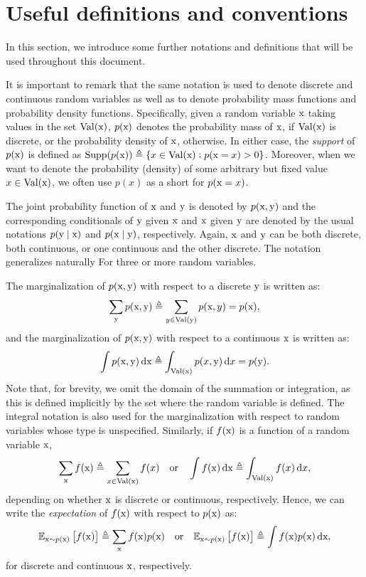 \section{Useful definitions and conventions}
\label{sec:definitions}
In this section, we introduce some further notations and definitions that will be used throughout this document.

It is important to remark that the same notation is used to denote discrete and continuous random variables as well as to denote probability mass functions and probability density functions. Specifically, given a random variable ${\textnormal{x}}$ taking values in the set $\mathrm{Val}({\textnormal{x}})$, $p({\textnormal{x}})$ denotes the probability mass of ${\textnormal{x}}$, if $\mathrm{Val}({\textnormal{x}})$ is discrete, or the probability density of ${\textnormal{x}}$, otherwise. In either case, the \emph{support} of $p({\textnormal{x}})$ is defined as $\mathrm{Supp}(p({\textnormal{x}})) \triangleq \lbrace x \in \mathrm{Val}({\textnormal{x}}): p({\textnormal{x}}=x) > 0 \rbrace$. Moreover, when we want to denote the probability (density) of some arbitrary but fixed value $x \in \mathrm{Val}({\textnormal{x}})$, we often use $p(x)$ as a short for $p({\textnormal{x}}=x)$.

The joint probability function of ${\textnormal{x}}$ and ${\textnormal{y}}$ is denoted by $p({\textnormal{x}},{\textnormal{y}})$ and the corresponding conditionals of ${\textnormal{y}}$ given ${\textnormal{x}}$ and ${\textnormal{x}}$ given ${\textnormal{y}}$ are denoted by the usual notations $p({\textnormal{y}} \mid {\textnormal{x}})$ and $p({\textnormal{x}} \mid {\textnormal{y}})$, respectively. Again, ${\textnormal{x}}$ and ${\textnormal{y}}$ can be both discrete, both continuous, or one continuous and the other discrete. The notation generalizes naturally For three or more random variables.

The marginalization of $p({\textnormal{x}},{\textnormal{y}})$ with respect to a discrete ${\textnormal{y}}$ is written as:
\begin{equation}
    \sum_{{\textnormal{y}}} p({\textnormal{x}},{\textnormal{y}}) \triangleq \sum_{y \in \mathrm{Val}({\textnormal{y}})} p({\textnormal{x}},y) = p({\textnormal{x}}),
\end{equation}
and the marginalization of $p({\textnormal{x}},{\textnormal{y}})$ with respect to a continuous ${\textnormal{x}}$ is written as:
\begin{equation}
    \int p({\textnormal{x}},{\textnormal{y}}) {\,\text{d}} {\textnormal{x}} \triangleq \int_{\mathrm{Val}({\textnormal{x}})} p(x,{\textnormal{y}}) {\,\text{d}} x = p({\textnormal{y}}).
\end{equation}
Note that, for brevity, we omit the domain of the summation or integration, as this is defined implicitly by the set where the random variable is defined. The integral notation is also used for the marginalization with respect to random variables whose type is unspecified. Similarly, if $f({\textnormal{x}})$ is a function of a random variable ${\textnormal{x}}$,
\begin{equation}
    \sum_{\textnormal{x}} f({\textnormal{x}}) \triangleq \sum_{x \in \mathrm{Val}({\textnormal{x}})} f(x) \quad \text{or} \quad \int f({\textnormal{x}}) {\,\text{d}} {\textnormal{x}} \triangleq \int_{\mathrm{Val}({\textnormal{x}})} f(x) {\,\text{d}} x,
\end{equation}
depending on whether ${\textnormal{x}}$ is discrete or continuous, respectively. Hence, we can write the \emph{expectation} of $f({\textnormal{x}})$ with respect to $p({\textnormal{x}})$ as:
\begin{equation}
    \mathbb{E}_{{\textnormal{x}} \sim p({\textnormal{x}})} \left[f({\textnormal{x}})\right] \triangleq \sum_{\textnormal{x}} f({\textnormal{x}}) p({\textnormal{x}}) \quad \text{or} \quad \mathbb{E}_{{\textnormal{x}} \sim p({\textnormal{x}})} \left[f({\textnormal{x}})\right] \triangleq \int f({\textnormal{x}}) p({\textnormal{x}}) {\,\text{d}} {\textnormal{x}},
\end{equation}
for discrete and continuous ${\textnormal{x}}$, respectively.


